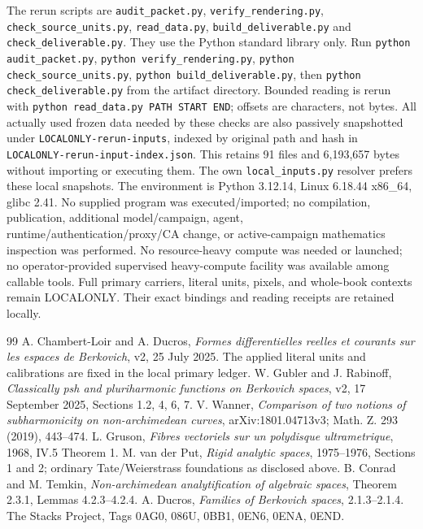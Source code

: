 \documentclass[11pt]{article}
\begin{document}
The rerun scripts are \texttt{audit\_packet.py}, \texttt{verify\_rendering.py},
\texttt{check\_source\_units.py}, \texttt{read\_data.py},
\texttt{build\_deliverable.py} and
\texttt{check\_deliverable.py}. They use the Python standard library only.
Run \texttt{python audit\_packet.py}, \texttt{python verify\_rendering.py},
\texttt{python check\_source\_units.py},
\texttt{python build\_deliverable.py}, then
\texttt{python check\_deliverable.py} from the artifact directory.
Bounded reading is rerun with
\texttt{python read\_data.py PATH START END}; offsets are characters, not bytes.
All actually used frozen data needed by these checks are also passively
snapshotted under \texttt{LOCALONLY-rerun-inputs}, indexed by original path
and hash in \texttt{LOCALONLY-rerun-input-index.json}. This retains 91 files
and 6,193,657 bytes without importing or executing them. The own
\texttt{local\_inputs.py} resolver prefers these local snapshots.
The environment is Python 3.12.14, Linux 6.18.44 x86\_64, glibc 2.41.
No supplied program was executed/imported; no compilation, publication,
additional model/campaign, agent, runtime/authentication/proxy/CA change, or
active-campaign mathematics inspection was performed.
No resource-heavy compute was needed or launched; no operator-provided
supervised heavy-compute facility was available among callable tools.
Full primary carriers, literal units, pixels, and whole-book contexts remain
LOCALONLY. Their exact bindings and reading receipts are retained locally.

\begin{thebibliography}{99}
 A. Chambert-Loir and A. Ducros, \emph{Formes differentielles reelles
et courants sur les espaces de Berkovich}, v2, 25 July 2025. The applied literal
units and calibrations are fixed in the local primary ledger.
 W. Gubler and J. Rabinoff, \emph{Classically psh and pluriharmonic
functions on Berkovich spaces}, v2, 17 September 2025, Sections 1.2, 4, 6, 7.
 V. Wanner, \emph{Comparison of two notions of subharmonicity on
non-archimedean curves}, arXiv:1801.04713v3; Math. Z. 293 (2019), 443--474.
 L. Gruson, \emph{Fibres vectoriels sur un polydisque ultrametrique},
1968, IV.5 Theorem 1.
 M. van der Put, \emph{Rigid analytic spaces}, 1975--1976,
Sections 1 and 2; ordinary Tate/Weierstrass foundations as disclosed above.
 B. Conrad and M. Temkin, \emph{Non-archimedean analytification of
algebraic spaces}, Theorem 2.3.1, Lemmas 4.2.3--4.2.4.
 A. Ducros, \emph{Families of Berkovich spaces}, 2.1.3--2.1.4.
 The Stacks Project, Tags 0AG0, 086U, 0BB1, 0EN6, 0ENA, 0END.
\end{thebibliography}
\end{document}
